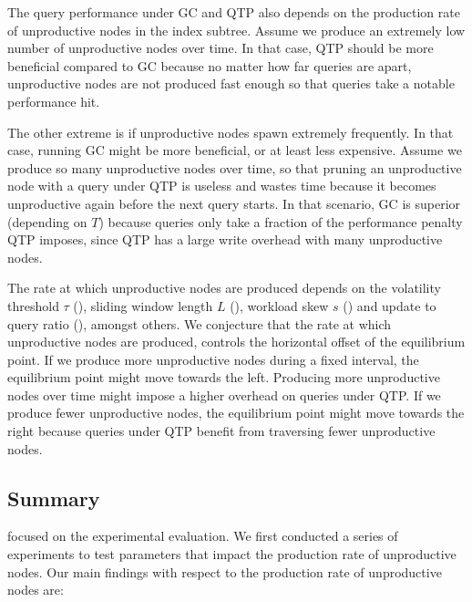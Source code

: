 \documentclass[abstracton,12pt]{scrartcl}
\theoremstyle{definition}
\begin{document}
The query performance under GC and QTP also depends
on the production rate of unproductive nodes
in the index subtree.
Assume we produce an extremely low number of unproductive nodes
over time. In that case, QTP should be more beneficial compared to GC 
because no matter how far queries are apart, unproductive nodes
are not produced fast enough so that queries take a notable performance hit.

The other extreme is if unproductive nodes spawn extremely frequently.
In that case, running GC might be more beneficial, or at least less expensive.
Assume we produce so many unproductive nodes over time, so that
pruning an unproductive node with a query under QTP is useless
and wastes time because it becomes unproductive again before
the next query starts. In that scenario, GC is superior (depending on $T$) 
because queries only take a fraction of the performance penalty QTP imposes,
since QTP has a large write overhead with many unproductive nodes.

The rate at which unproductive nodes are produced depends on the volatility
threshold $\tau$ (), sliding window length $L$
(), workload skew $s$ () and
update to query ratio (), amongst others.
We conjecture that the rate at which unproductive nodes are produced,
controls the horizontal offset of the equilibrium point.
If we produce more unproductive nodes during a fixed
interval, the equilibrium point might move towards the left. Producing more unproductive
nodes over time might impose a higher overhead on queries under QTP.
If we produce fewer unproductive nodes, the equilibrium point might move towards the right
because queries under QTP benefit from traversing fewer unproductive nodes.

\newpage

\subsection{Summary}

\label{sec:summary}

 focused on the experimental evaluation.
We first conducted a series of experiments to test parameters that
impact the production rate of unproductive nodes.
Our main findings with respect to the production rate of unproductive nodes are:
\end{document}
